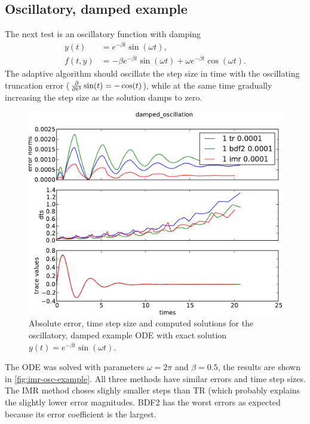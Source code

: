\subsection{Oscillatory, damped example}
\label{sec:oscill-damp-example}

The next test is an oscillatory function with damping
\begin{equation}
  \label{eqn:imr-test-osc-damp}
  \begin{aligned}
    y(t) &= e^{-\beta t} \sin(\omega t), \\
    f(t,y) &= - \beta e^{-\beta t} \sin(\omega t) + \omega e^{-\beta t} \cos(\omega t).  \end{aligned}
\end{equation} 
The adaptive algorithm should oscillate the step size in time with the oscillating truncation error ($\frac{\partial }{\partial t^3} \sin(t) = -\cos(t)$), while at the same time gradually increasing the step size as the solution damps to zero.

\begin{figure}[h!]
  \centering \includegraphics[width=1\textwidth]{aimr/damped_oscillation-errornormsvs-dtsvs-tracevaluesvstimes}
  \caption{Absolute error, time step size and computed solutions for the oscillatory, damped example ODE with exact solution $y(t) = e^{-\beta t} \sin(\omega t)$.}
  \label{fig:imr-osc-example}
\end{figure}

The ODE was solved with parameters $\omega = 2 \pi$ and $\beta = 0.5$, the results are shown in \autoref{fig:imr-osc-example}.
All three methods have similar errors and time step sizes.
The IMR method choses slighly smaller steps than TR (which probably explains the slightly lower error magnitudes.
BDF2 has the worst errors as expected because its error coefficient is the largest.

